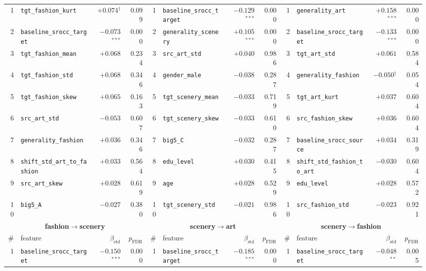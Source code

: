 \begin{table}[t]
\begin{tabular}{rlrr@{\hspace{8pt}}rlrr@{\hspace{8pt}}rlrr}
\midrule
1 & \texttt{tgt\_fashion\_kurt} & $+0.074$$^{\dagger}$ & 0.099 & 1 & \texttt{baseline\_srocc\_target} & $-0.129$$^{***}$ & 0.000 & 1 & \texttt{generality\_art} & $+0.158$$^{***}$ & 0.000 \\
2 & \texttt{baseline\_srocc\_target} & $-0.073$$^{***}$ & 0.000 & 2 & \texttt{generality\_scenery} & $+0.105$$^{***}$ & 0.000 & 2 & \texttt{baseline\_srocc\_target} & $-0.133$$^{***}$ & 0.000 \\
3 & \texttt{tgt\_fashion\_mean} & $+0.068$ & 0.234 & 3 & \texttt{src\_art\_std} & $+0.040$ & 0.986 & 3 & \texttt{tgt\_art\_std} & $+0.061$ & 0.584 \\
4 & \texttt{tgt\_fashion\_std} & $+0.068$ & 0.346 & 4 & \texttt{gender\_male} & $-0.038$ & 0.287 & 4 & \texttt{generality\_fashion} & $-0.050$$^{\dagger}$ & 0.054 \\
5 & \texttt{tgt\_fashion\_skew} & $+0.065$ & 0.163 & 5 & \texttt{tgt\_scenery\_mean} & $-0.033$ & 0.719 & 5 & \texttt{tgt\_art\_kurt} & $+0.037$ & 0.604 \\
6 & \texttt{src\_art\_std} & $-0.053$ & 0.607 & 6 & \texttt{tgt\_scenery\_skew} & $-0.033$ & 0.610 & 6 & \texttt{src\_fashion\_skew} & $+0.036$ & 0.604 \\
7 & \texttt{generality\_fashion} & $+0.036$ & 0.346 & 7 & \texttt{big5\_C} & $-0.032$ & 0.287 & 7 & \texttt{baseline\_srocc\_source} & $+0.034$ & 0.319 \\
8 & \texttt{shift\_std\_art\_to\_fashion} & $+0.033$ & 0.564 & 8 & \texttt{edu\_level} & $+0.030$ & 0.415 & 8 & \texttt{shift\_std\_fashion\_to\_art} & $-0.030$ & 0.604 \\
9 & \texttt{src\_art\_skew} & $+0.028$ & 0.619 & 9 & \texttt{age} & $+0.028$ & 0.529 & 9 & \texttt{edu\_level} & $+0.028$ & 0.572 \\
10 & \texttt{big5\_A} & $-0.027$ & 0.380 & 10 & \texttt{tgt\_scenery\_std} & $-0.021$ & 0.986 & 10 & \texttt{src\_fashion\_std} & $-0.023$ & 0.921 \\
\midrule
\multicolumn{4}{c}{\textbf{fashion$\to$scenery}} & \multicolumn{4}{c}{\textbf{scenery$\to$art}} & \multicolumn{4}{c}{\textbf{scenery$\to$fashion}} \\
\# & feature & $\beta_{\mathrm{std}}$ & $p_{\mathrm{FDR}}$ & \# & feature & $\beta_{\mathrm{std}}$ & $p_{\mathrm{FDR}}$ & \# & feature & $\beta_{\mathrm{std}}$ & $p_{\mathrm{FDR}}$ \\
\midrule
1 & \texttt{baseline\_srocc\_target} & $-0.150$$^{***}$ & 0.000 & 1 & \texttt{baseline\_srocc\_target} & $-0.185$$^{***}$ & 0.000 & 1 & \texttt{baseline\_srocc\_target} & $-0.048$$^{**}$ & 0.005 \\

\end{tabular}
\end{table}
